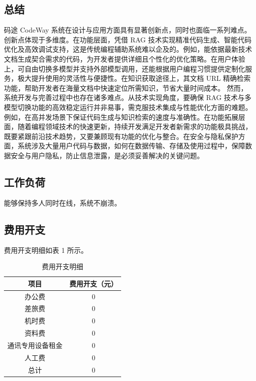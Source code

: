 \documentclass[
    report,     %
    oneside,    %
    UTF8,       %
    zihao=-4    %
]{config} %
\begin{document}
\subsection{总结}
码途 CodeWay 系统在设计与应用方面具有显著创新点，同时也面临一系列难点。
创新点体现于多维度。在功能层面，凭借 RAG 技术实现精准代码生成、智能代码优化及高效调试支持，这是传统编程辅助系统难以企及的。例如，能依据最新技术文档生成契合需求的代码，为开发者提供详细且个性化的优化策略。在用户体验上，可自由切换多模型并支持外部模型调用，还能根据用户编程习惯提供定制化服务，极大提升使用的灵活性与便捷性。在知识获取途径上，其文档 URL 精确检索功能，帮助开发者在海量文档中快速定位所需知识，节省大量时间成本。
然而，系统开发与完善过程中也存在诸多难点。从技术实现角度，要确保 RAG 技术与多模型切换功能的高效稳定运行并非易事，需克服技术集成与性能优化方面的难题。例如，在高并发场景下保证代码生成与知识检索的速度与准确性。在功能拓展层面，随着编程领域技术的快速更新，持续开发满足开发者新需求的功能极具挑战，既要紧跟前沿技术趋势，又要兼顾现有功能的优化与整合。在安全与隐私保护方面，系统涉及大量用户代码与数据，如何在数据传输、存储及使用过程中，保障数据安全与用户隐私，防止信息泄露，是必须妥善解决的关键问题。
\subsection{工作负荷}
能够保持多人同时在线，系统不崩溃。
\subsection{费用开支}
费用开支明细如表 1 所示。
\begin{table}[H] %
    \centering %
    \caption{费用开支明细} %
    \label{tab:cost} %
    \renewcommand\arraystretch{0.85} %
    \setlength{\tabcolsep}{12pt} %
    \begin{tabular}{cc} %
        \toprule[1.5pt] %
        \textbf{项目} & \textbf{费用开支（元）} \\ %
        \midrule[0.8pt] %
            办公费 & 0 \\
            差旅费 & 0 \\
            机时费 & 0 \\
            资料费 & 0 \\
            通讯专用设备租金 & 0 \\
            人工费 & 0 \\
            总计 & 0 \\
        \hline\hline %
    \end{tabular}
\end{table}
\end{document}
